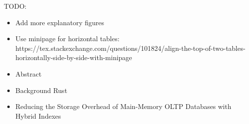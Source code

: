 \color{purple}
TODO:
\begin{itemize}
  \item Add more explanatory figures
  \item Use minipage for horizontal tables: https://tex.stackexchange.com/questions/101824/align-the-top-of-two-tables-horizontally-side-by-side-with-minipage

  \item Abstract
  \item Background Rust
  \item Reducing the Storage Overhead of Main-Memory OLTP Databases with Hybrid Indexes
\end{itemize}
